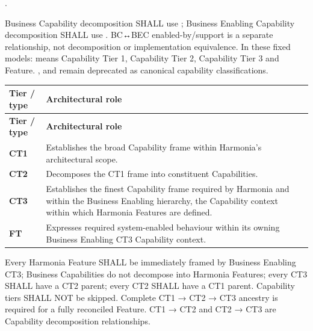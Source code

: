 \texttt{}.

\label{rad:tier-model:15}

Business Capability decomposition SHALL use \texttt{}; Business Enabling Capability decomposition SHALL use \texttt{}. BC↔BEC enabled-by/\allowbreak{}support is a separate relationship, not decomposition or implementation equivalence. In these fixed models: \texttt{} means Capability Tier 1, \texttt{} Capability Tier 2, \texttt{} Capability Tier 3 and \texttt{} Feature. \texttt{}, \texttt{} and \texttt{} remain deprecated as canonical capability classifications.

\label{rad:tier-model:17}
\begingroup\small\setlength{\TableWidth}{\dimexpr\linewidth-4\tabcolsep-3\arrayrulewidth\relax}
\begin{longtable}{|>{\raggedright\arraybackslash}p{0.35\TableWidth}|>{\raggedright\arraybackslash}p{0.65\TableWidth}|}
\hline\rowcolor{TableHead}\textbf{Tier /\allowbreak{} type} & \textbf{Architectural role}\\\hline\endfirsthead
\hline\rowcolor{TableHead}\textbf{Tier /\allowbreak{} type} & \textbf{Architectural role}\\\hline\endhead
\hline\endfoot
\textbf{CT1} & Establishes the broad Capability frame within Harmonia's architectural scope.\\\hline
\textbf{CT2} & Decomposes the CT1 frame into constituent Capabilities.\\\hline
\textbf{CT3} & Establishes the finest Capability frame required by Harmonia and within the Business Enabling hierarchy, the Capability context within which Harmonia Features are defined.\\\hline
\textbf{FT} & Expresses required system-enabled behaviour within its owning Business Enabling CT3 Capability context.\\\hline
\end{longtable}\endgroup
{}\label{rad:tier-model:24}

Every Harmonia Feature SHALL be immediately framed by Business Enabling CT3; Business Capabilities do not decompose into Harmonia Features; every CT3 SHALL have a CT2 parent; every CT2 SHALL have a CT1 parent. Capability tiers SHALL NOT be skipped. Complete CT1 → CT2 → CT3 ancestry is required for a fully reconciled Feature. CT1 → CT2 and CT2 → CT3 are Capability decomposition relationships.


